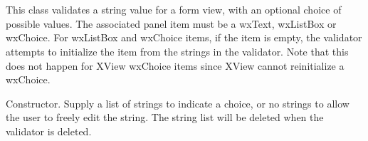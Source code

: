 \section{}\label{wxstringformvalidator}


This class validates a string value for a form view, with an optional choice of possible values.
The associated panel item must be a wxText, wxListBox or wxChoice. For wxListBox and wxChoice items,
if the item is empty, the validator attempts to initialize the item from the strings in
the validator. Note that this does not happen for XView wxChoice items since XView cannot reinitialize a wxChoice.
 


Constructor. Supply a list of strings to indicate a choice, or no strings to allow the
user to freely edit the string. The string list will be deleted when the validator is deleted.


